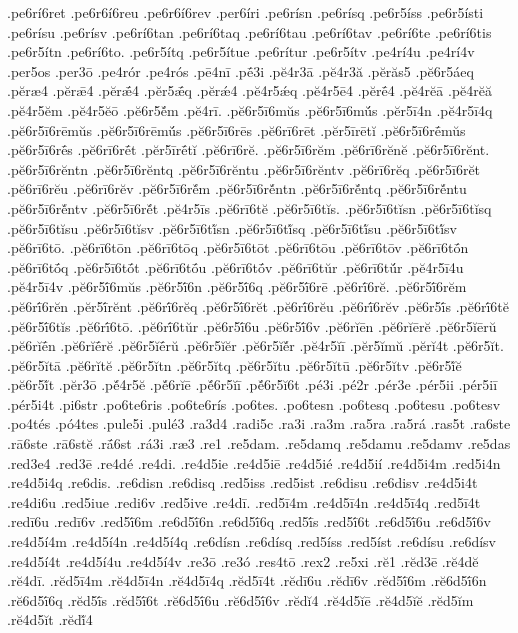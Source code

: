 {.pe6rí6ret
.pe6r6í6reu
.pe6r6í6rev
.per6íri
.pe6rísn
.pe6rísq
.pe6r5íss
.pe6r5ísti
.pe6rísu
.pe6rísv
.pe6rí6tan
.pe6rí6taq
.pe6rí6tau
.pe6rí6tav
.pe6rí6te
.pe6rí6tis
.pe6r5ítn
.pe6rí6to.
.pe6r5ítq
.pe6r5ítue
.pe6rítur
.pe6r5ítv
.pe4rí4u
.pe4rí4v
.per5os
.per3ō
.pe4rór
.pe4rós
.pē4nī
.pḗ3i
.pĕ4r3ā
.pĕ4r3ă
.pĕrăs5
.pĕ6r5áeq
.pĕræ4
.pĕrǣ4
.pĕrǣ́4
.pĕr5ǣ́q
.pĕrǽ4
.pĕ4r5ǽq
.pĕ4r5ē4
.pĕrḗ4
.pĕ4rĕā
.pĕ4rĕă
.pĕ4r5ĕm
.pĕ4r5ĕō
.pĕ6r5ĕ́m
.pĕ4rī.
.pĕ6r5ī6mŭs
.pĕ6r5ī6mŭ́s
.pĕr5ī4n
.pĕ4r5ī4q
.pĕ6r5ī6rēmŭs
.pĕ6r5ī6rēmŭ́s
.pĕ6r5ī6rēs
.pĕ6rī6rēt
.pĕr5īrētĭ
.pĕ6r5ī6rḗmŭs
.pĕ6r5ī6rḗs
.pĕ6rī6rḗt
.pĕr5īrḗtĭ
.pĕ6rī6rĕ.
.pĕ6r5ī6rĕm
.pĕ6rī6rĕnĕ
.pĕ6r5ī6rĕnt.
.pĕ6r5ī6rĕntn
.pĕ6r5ī6rĕntq
.pĕ6r5ī6rĕntu
.pĕ6r5ī6rĕntv
.pĕ6rī6rĕq
.pĕ6r5ī6rĕt
.pĕ6rī6rĕu
.pĕ6rī6rĕv
.pĕ6r5ī6rĕ́m
.pĕ6r5ī6rĕ́ntn
.pĕ6r5ī6rĕ́ntq
.pĕ6r5ī6rĕ́ntu
.pĕ6r5ī6rĕ́ntv
.pĕ6r5ī6rĕ́t
.pĕ4r5īs
.pĕ6rī6tĕ
.pĕ6r5ī6tĭs.
.pĕ6r5ī6tĭsn
.pĕ6r5ī6tĭsq
.pĕ6r5ī6tĭsu
.pĕ6r5ī6tĭsv
.pĕ6r5ī6tĭ́sn
.pĕ6r5ī6tĭ́sq
.pĕ6r5ī6tĭ́su
.pĕ6r5ī6tĭ́sv
.pĕ6rī6tō.
.pĕ6rī6tōn
.pĕ6rī6tōq
.pĕ6r5ī6tōt
.pĕ6rī6tōu
.pĕ6rī6tōv
.pĕ6rī6tṓn
.pĕ6rī6tṓq
.pĕ6r5ī6tṓt
.pĕ6rī6tṓu
.pĕ6rī6tṓv
.pĕ6rī6tŭr
.pĕ6rī6tŭ́r
.pĕ4r5ī4u
.pĕ4r5ī4v
.pĕ6r5ī́6mŭs
.pĕ6r5ī́6n
.pĕ6r5ī́6q
.pĕ6r5ī́6rē
.pĕ6rī́6rĕ.
.pĕ6r5ī́6rĕm
.pĕ6rī́6rĕn
.pĕr5ī́rĕnt
.pĕ6rī́6rĕq
.pĕ6r5ī́6rĕt
.pĕ6rī́6rĕu
.pĕ6rī́6rĕv
.pĕ6r5ī́s
.pĕ6rī́6tĕ
.pĕ6r5ī́6tĭs
.pĕ6rī́6tō.
.pĕ6rī́6tŭr
.pĕ6r5ī́6u
.pĕ6r5ī́6v
.pĕ6rĭēn
.pĕ6rĭērĕ
.pĕ6r5ĭērŭ
.pĕ6rĭḗn
.pĕ6rĭḗrĕ
.pĕ6r5ĭḗrŭ
.pĕ6r5ĭĕr
.pĕ6r5ĭĕ́r
.pĕ4r5ĭī
.pĕr5ĭmŭ
.pĕrĭ4t
.pĕ6r5ĭt.
.pĕ6r5ĭtā
.pĕ6rĭtĕ
.pĕ6r5ĭtn
.pĕ6r5ĭtq
.pĕ6r5ĭtu
.pĕ6r5ĭtū
.pĕ6r5ĭtv
.pĕ6r5ĭ́ĕ
.pĕ6r5ĭ́t
.pĕr3ō
.pĕ́4r5ĕ
.pĕ́6rĭē
.pĕ́6r5ĭī
.pĕ́6r5ĭ6t
.pé3i
.pé2r
.pér3e
.pér5ii
.pér5iī
.pér5i4t
.pi6str
.po6te6ris
.po6te6rís
.po6tes.
.po6tesn
.po6tesq
.po6tesu
.po6tesv
.po4tés
.pó4tes
.pule5i
.pulé3
.ra3d4
.radi5c
.ra3i
.ra3m
.ra5ra
.ra5rá
.ras5t
.ra6ste
.rā6ste
.rā6stĕ
.rā́6st
.rá3i
.ræ3
.re1
.re5dam.
.re5damq
.re5damu
.re5damv
.re5das
.red3e4
.red3ē
.re4dé
.re4di.
.re4d5ie
.re4d5iē
.re4d5ié
.re4d5ií
.re4d5i4m
.red5i4n
.re4d5i4q
.re6dis.
.re6disn
.re6disq
.red5iss
.red5ist
.re6disu
.re6disv
.re4d5i4t
.re4di6u
.red5iue
.redi6v
.red5ive
.re4dī.
.red5ī4m
.re4d5ī4n
.re4d5ī4q
.red5ī4t
.redī6u
.redī6v
.red5ī́6m
.re6d5ī́6n
.re6d5ī́6q
.red5ī́s
.red5ī́6t
.re6d5ī́6u
.re6d5ī́6v
.re4d5í4m
.re4d5í4n
.re4d5í4q
.re6dísn
.re6dísq
.red5íss
.red5íst
.re6dísu
.re6dísv
.re4d5í4t
.re4d5í4u
.re4d5í4v
.re3ō
.re3ó
.res4tō
.rex2
.re5xi
.rĕ1
.rĕd3ē
.rĕ4dĕ
.rĕ4dī.
.rĕd5ī4m
.rĕ4d5ī4n
.rĕ4d5ī4q
.rĕd5ī4t
.rĕdī6u
.rĕdī6v
.rĕd5ī́6m
.rĕ6d5ī́6n
.rĕ6d5ī́6q
.rĕd5ī́s
.rĕd5ī́6t
.rĕ6d5ī́6u
.rĕ6d5ī́6v
.rĕdĭ4
.rĕ4d5ĭē
.rĕ4d5ĭĕ
.rĕd5ĭm
.rĕ4d5ĭt
.rĕdĭ́4
}
